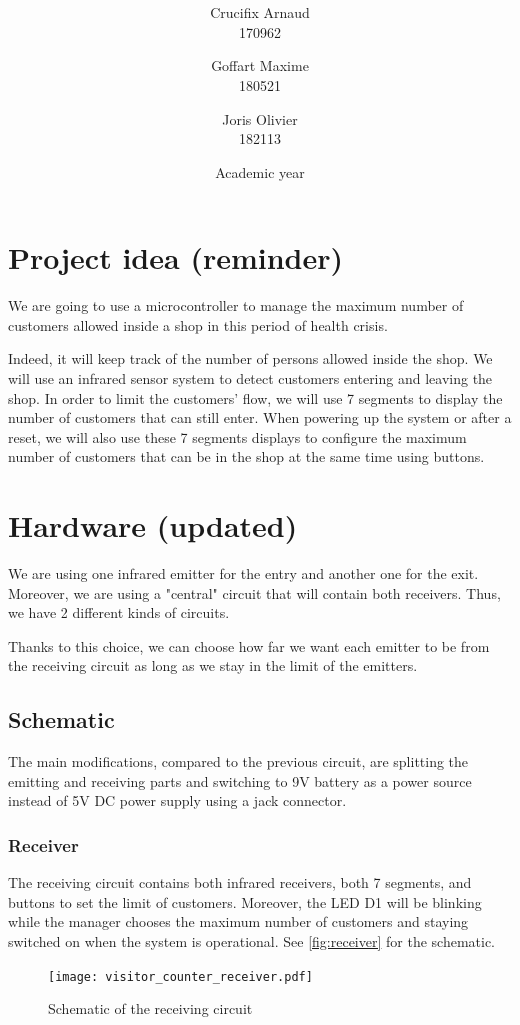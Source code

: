 \documentclass[a4paper, 11pt, oneside]{article}
\title{\ClassName\\\vspace*{0.8cm}\ProjectName\vspace{0.8cm}}
\author{Crucifix Arnaud \\170962 \and Goffart Maxime \\180521 \and Joris Olivier \\ 182113}
\date{\vspace{1cm}Academic year \AcademicYear}
\begin{document}
\begin{titlingpage}
{\let\newpage\relax\maketitle}
\end{titlingpage}


\section{Project idea \small{(reminder)}}

We are going to use a microcontroller to manage the maximum number of customers allowed inside a shop in this period of health crisis. \par
Indeed, it will keep track of the number of persons allowed inside the shop. We will use an infrared sensor system to detect customers entering and leaving the shop. In order to limit the customers' flow, we will use 7 segments to display the number of customers that can still enter. When powering up the system or after a reset, we will also use these 7 segments displays to configure the maximum number of customers that can be in the shop at the same time using buttons.


\section{Hardware \small{(updated)}}
We are using one infrared emitter for the entry and another one for the exit. Moreover, we are using a "central" circuit that will contain both receivers. Thus, we have 2 different kinds of circuits.\par
Thanks to this choice, we can choose how far we want each emitter to be from the receiving circuit as long as we stay in the limit of the emitters.

\subsection{Schematic}
The main modifications, compared to the previous circuit, are splitting the emitting and receiving parts and switching to 9V battery as a power source instead of 5V DC power supply using a jack connector.

\subsubsection{Receiver}
The receiving circuit contains both infrared receivers, both 7 segments, and buttons to set the limit of customers. Moreover, the LED D1 will be blinking while the manager chooses the maximum number of customers and staying switched on when the system is operational. See \autoref{fig:receiver} for the schematic.
\begin{figure}[p]
    \centering
    \texttt{[image: visitor\_counter\_receiver.pdf]}
    \caption{Schematic of the receiving circuit}\label{fig:receiver}
\end{figure}
\end{document}
